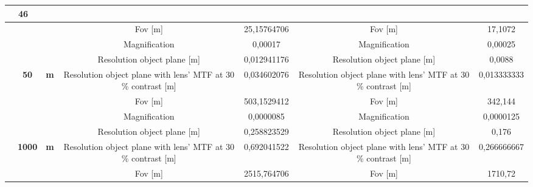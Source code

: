 \begin{table}[H]
{\begin{tabular}{ccc|cc|cc|}
  \multicolumn{2}{c|}{46} \\ \hline
\multicolumn{1}{|c|}{} &
  \cellcolor[HTML]{EFEFEF} &
  \cellcolor[HTML]{EFEFEF} &
  \cellcolor[HTML]{EFEFEF}Fov {[}m{]} &
  \cellcolor[HTML]{EFEFEF}25,15764706 &
  \cellcolor[HTML]{EFEFEF}Fov {[}m{]} &
  \cellcolor[HTML]{EFEFEF}17,1072 \\
\multicolumn{1}{|c|}{} &
  \cellcolor[HTML]{EFEFEF} &
  \cellcolor[HTML]{EFEFEF} &
  Magnification &
  0,00017 &
  Magnification &
  0,00025 \\
\multicolumn{1}{|c|}{} &
  \cellcolor[HTML]{EFEFEF} &
  \cellcolor[HTML]{EFEFEF} &
  \cellcolor[HTML]{EFEFEF}Resolution object plane {[}m{]} &
  \cellcolor[HTML]{EFEFEF}0,012941176 &
  \cellcolor[HTML]{EFEFEF}Resolution object plane {[}m{]} &
  \cellcolor[HTML]{EFEFEF}0,0088 \\
\multicolumn{1}{|c|}{} &
  \multirow{-4}{*}{\cellcolor[HTML]{EFEFEF}\textbf{50}} &
  \multirow{-4}{*}{\cellcolor[HTML]{EFEFEF}\textbf{m}} &
  Resolution object plane with lens' MTF at 30 \% contrast {[}m{]} &
  0,034602076 &
  Resolution object plane with lens' MTF at 30 \% contrast {[}m{]} &
  0,013333333 \\ \cline{2-7} 
\multicolumn{1}{|c|}{} &
  \cellcolor[HTML]{EFEFEF} &
  \cellcolor[HTML]{EFEFEF} &
  \cellcolor[HTML]{EFEFEF}Fov {[}m{]} &
  \cellcolor[HTML]{EFEFEF}503,1529412 &
  \cellcolor[HTML]{EFEFEF}Fov {[}m{]} &
  \cellcolor[HTML]{EFEFEF}342,144 \\
\multicolumn{1}{|c|}{} &
  \cellcolor[HTML]{EFEFEF} &
  \cellcolor[HTML]{EFEFEF} &
  Magnification &
  0,0000085 &
  Magnification &
  0,0000125 \\
\multicolumn{1}{|c|}{} &
  \cellcolor[HTML]{EFEFEF} &
  \cellcolor[HTML]{EFEFEF} &
  \cellcolor[HTML]{EFEFEF}Resolution object plane {[}m{]} &
  \cellcolor[HTML]{EFEFEF}0,258823529 &
  \cellcolor[HTML]{EFEFEF}Resolution object plane {[}m{]} &
  \cellcolor[HTML]{EFEFEF}0,176 \\
\multicolumn{1}{|c|}{} &
  \multirow{-4}{*}{\cellcolor[HTML]{EFEFEF}\textbf{1000}} &
  \multirow{-4}{*}{\cellcolor[HTML]{EFEFEF}\textbf{m}} &
  Resolution object plane with lens' MTF at 30 \% contrast {[}m{]} &
  0,692041522 &
  Resolution object plane with lens' MTF at 30 \% contrast {[}m{]} &
  0,266666667 \\ \cline{2-7} 
\multicolumn{1}{|c|}{} &
  \cellcolor[HTML]{EFEFEF} &
  \cellcolor[HTML]{EFEFEF} &
  \cellcolor[HTML]{EFEFEF}Fov {[}m{]} &
  \cellcolor[HTML]{EFEFEF}2515,764706 &
  \cellcolor[HTML]{EFEFEF}Fov {[}m{]} &
  \cellcolor[HTML]{EFEFEF}1710,72 \\

\end{tabular}}
\end{table}
